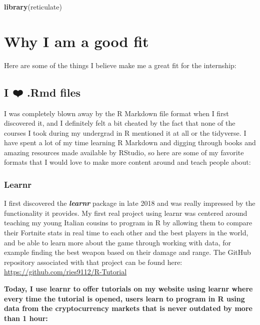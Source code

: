\documentclass[
]{book}
\newenvironment{Shaded}{\begin{snugshade}}{\end{snugshade}}
\newcommand{\KeywordTok}[1]{\textcolor[rgb]{0.13,0.29,0.53}{\textbf{#1}}}
\newcommand{\NormalTok}[1]{#1}
\begin{document}
\begin{Shaded}
\begin{Highlighting}[]
\KeywordTok{library}\NormalTok{(reticulate)}
\end{Highlighting}
\end{Shaded}

\hypertarget{fit}{%
\chapter{Why I am a good fit}\label{fit}}

Here are some of the things I believe make me a great fit for the internship:

\hypertarget{i-uxfe0f-.rmd-files}{%
\section{I ❤️ .Rmd files}\label{i-uxfe0f-.rmd-files}}

I was completely blown away by the R Markdown file format when I first discovered it, and I definitely felt a bit cheated by the fact that none of the courses I took during my undergrad in R mentioned it at all or the tidyverse. I have spent a lot of my time learning R Markdown and digging through books and amazing resources made available by RStudio, so here are some of my favorite formats that I would love to make more content around and teach people about:

\hypertarget{learnr}{%
\subsection{Learnr}\label{learnr}}

I first discovered the \textbf{\emph{learnr}} \citep{R-learnr} package in late 2018 and was really impressed by the functionality it provides. My first real project using learnr was centered around teaching my young Italian cousins to program in R by allowing them to compare their Fortnite stats in real time to each other and the best players in the world, and be able to learn more about the game through working with data, for example finding the best weapon based on their damage and range. The GitHub repository associated with that project can be found here: \url{https://github.com/ries9112/R-Tutorial}

\textbf{Today, I use learnr to offer tutorials on my website using learnr where every time the tutorial is opened, users learn to program in R using data from the cryptocurrency markets that is never outdated by more than 1 hour:}
\end{document}

